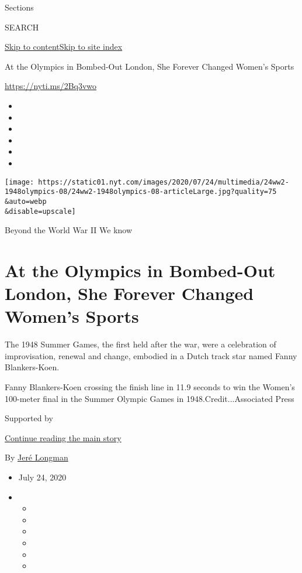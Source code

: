 Sections

SEARCH

\protect\hyperlink{site-content}{Skip to
content}\protect\hyperlink{site-index}{Skip to site index}

At the Olympics in Bombed-Out London, She Forever Changed Women's Sports

\url{https://nyti.ms/2Bq3vwo}

\begin{itemize}
\item
\item
\item
\item
\item
\item
\end{itemize}

\texttt{[image: https://static01.nyt.com/images/2020/07/24/multimedia/24ww2-1948olympics-08/24ww2-1948olympics-08-articleLarge.jpg?quality=75\\\&auto=webp\\\&disable=upscale]}

Beyond the World War II We know

\hypertarget{at-the-olympics-in-bombed-out-london-she-forever-changed-womens-sports}{%
\section{At the Olympics in Bombed-Out London, She Forever Changed
Women's
Sports}\label{at-the-olympics-in-bombed-out-london-she-forever-changed-womens-sports}}

The 1948 Summer Games, the first held after the war, were a celebration
of improvisation, renewal and change, embodied in a Dutch track star
named Fanny Blankers-Koen.

Fanny Blankers-Koen crossing the finish line in 11.9 seconds to win the
Women's 100-meter final in the Summer Olympic Games in
1948.Credit...Associated Press

Supported by

\protect\hyperlink{after-sponsor}{Continue reading the main story}

By \href{https://www.nytimes.com/by/jere-longman}{Jeré Longman}

\begin{itemize}
\item
  July 24, 2020
\item
  \begin{itemize}
  \item
  \item
  \item
  \item
  \item
  \item
  \end{itemize}
\end{itemize}

